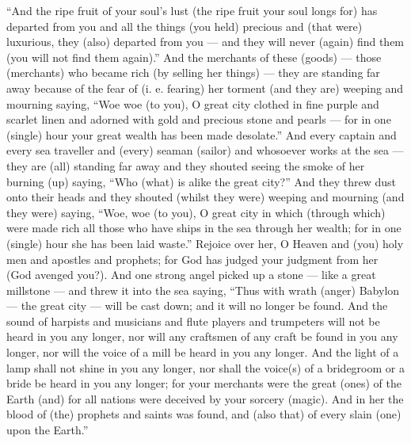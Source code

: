 \begin{pages}
\begin{Leftside}
		\pend
		\pstart
		“And the ripe fruit of your soul’s lust (the ripe fruit your soul longs for) has departed from you and all the things (you held) precious and (that were) luxurious, they (also) departed from you — and they will never (again) find them (you will not find them again).” 
		\pend
		\pstart
		And the merchants of these (goods) — those (merchants) who became rich (by selling her things) — they are standing far away because of the fear of (i. e. fearing) her torment (and they are) weeping and mourning saying, “Woe woe (to you), O great city clothed in fine purple and scarlet linen and adorned with gold and precious stone and pearls — for in one (single) hour your great wealth has been made desolate.”
		\pend
		\pstart
		And every captain and every sea traveller and (every) seaman (sailor) and whosoever works at the sea — they are (all) standing far away and they shouted seeing the smoke of her burning (up) saying, “Who (what) is alike the great city?” And they threw dust onto their heads and they shouted (whilst they were) weeping and mourning (and they were) saying, “Woe, woe (to you), O great city in which (through which) were made rich all those who have ships in the sea through her wealth; for in one (single) hour she has been laid waste.” Rejoice over her, O Heaven and (you) holy men and apostles and prophets; for God has judged your judgment from her (God avenged you?). 
		\pend
		\pstart
		And one strong angel picked up a stone — like a great millstone — and threw it into the sea saying, “Thus with wrath (anger) Babylon — the great city — will be cast down; and it will no longer be found. And the sound of harpists and musicians and flute players and trumpeters will not be heard in you any longer, nor will any craftsmen of any craft be found in you any longer, nor will the voice of a mill be heard in you any longer. And the light of a lamp shall not shine in you any longer, nor shall the voice(s) of a bridegroom or a bride be heard in you any longer; for your merchants were the great (ones) of the Earth (and) for all nations were deceived by your sorcery (magic). And in her the blood of (the) prophets and saints was found, and (also that) of every slain (one) upon the Earth.” 
		\pend
        \endnumbering
    \end{Leftside}

\end{pages} 
\Pages

